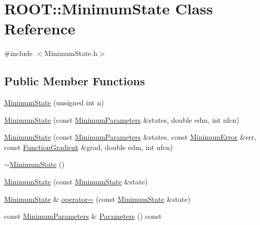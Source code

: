 \hypertarget{classROOT_1_1Minuit2_1_1MinimumState}{}\section{R\+O\+OT\+:\+:Minimum\+State Class Reference}
\label{classROOT_1_1Minuit2_1_1MinimumState}


{\ttfamily \#include $<$Minimum\+State.\+h$>$}

\subsection*{Public Member Functions}
\begin{DoxyCompactItemize}
\item 
\mbox{\hyperlink{classROOT_1_1Minuit2_1_1MinimumState_a47a98082c74eff4dc1fc1758078c27d6}{Minimum\+State}} (unsigned int n)
\item 
\mbox{\hyperlink{classROOT_1_1Minuit2_1_1MinimumState_a602211ccc0379969a079ebf4de44421b}{Minimum\+State}} (const \mbox{\hyperlink{classROOT_1_1Minuit2_1_1MinimumParameters}{Minimum\+Parameters}} \&states, double edm, int nfcn)
\item 
\mbox{\hyperlink{classROOT_1_1Minuit2_1_1MinimumState_a35c2e0098d60a9caeee9e2c60093b5a9}{Minimum\+State}} (const \mbox{\hyperlink{classROOT_1_1Minuit2_1_1MinimumParameters}{Minimum\+Parameters}} \&states, const \mbox{\hyperlink{classROOT_1_1Minuit2_1_1MinimumError}{Minimum\+Error}} \&err, const \mbox{\hyperlink{classROOT_1_1Minuit2_1_1FunctionGradient}{Function\+Gradient}} \&grad, double edm, int nfcn)
\item 
\mbox{\hyperlink{classROOT_1_1Minuit2_1_1MinimumState_a30666c7113d7e8c199d4de1b1a44ee03}{$\sim$\+Minimum\+State}} ()
\item 
\mbox{\hyperlink{classROOT_1_1Minuit2_1_1MinimumState_a7e5a25f631c74fffd8cfd14d2268600e}{Minimum\+State}} (const \mbox{\hyperlink{classROOT_1_1Minuit2_1_1MinimumState}{Minimum\+State}} \&state)
\item 
\mbox{\hyperlink{classROOT_1_1Minuit2_1_1MinimumState}{Minimum\+State}} \& \mbox{\hyperlink{classROOT_1_1Minuit2_1_1MinimumState_ad0d12f94b8f1adca2b2c4279006f82e4}{operator=}} (const \mbox{\hyperlink{classROOT_1_1Minuit2_1_1MinimumState}{Minimum\+State}} \&state)
\item 
const \mbox{\hyperlink{classROOT_1_1Minuit2_1_1MinimumParameters}{Minimum\+Parameters}} \& \mbox{\hyperlink{classROOT_1_1Minuit2_1_1MinimumState_aa81bb59c8eb8c262ef2487ca1b025481}{Parameters}} () const

\end{DoxyCompactItemize}
